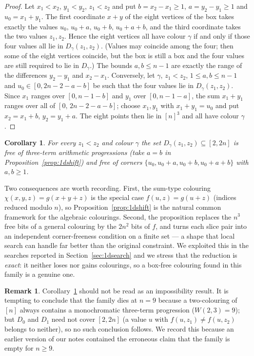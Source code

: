 \documentclass[11pt]{article}
\newtheorem{corollary}[theorem]{Corollary}
\theoremstyle{definition}
\newtheorem{remark}[theorem]{Remark}
\begin{document}
\begin{proof}
Let $x_1<x_2$, $y_1<y_2$, $z_1<z_2$ and put $b=x_2-x_1\ge1$, $a=y_2-y_1\ge1$ and
$u_0=x_1+y_1$. The first coordinate $x+y$ of the eight vertices of the box takes exactly
the values $u_0,\,u_0+a,\,u_0+b,\,u_0+a+b$, and the third coordinate takes the two values
$z_1,z_2$. Hence the eight vertices all have colour $\gamma$ if and only if those four
values all lie in $D_\gamma(z_1,z_2)$. (Values may coincide among the four; then some of
the eight vertices coincide, but the box is still a box and the four values are still
required to lie in $D_\gamma$.)
The bounds $a,b\le n-1$ are exactly the range of the differences $y_2-y_1$ and $x_2-x_1$.
Conversely, let $\gamma$, $z_1<z_2$, $1\le a,b\le n-1$ and $u_0\in[0,2n-2-a-b]$ be such
that the four values lie in $D_\gamma(z_1,z_2)$. Since $x_1$ ranges over $[0,n-1-b]$ and
$y_1$ over $[0,n-1-a]$, the sum $x_1+y_1$ ranges over all of $[0,\,2n-2-a-b]$; choose
$x_1,y_1$ with $x_1+y_1=u_0$ and put $x_2=x_1+b$, $y_2=y_1+a$. The eight points then lie in
$[n]^3$ and all have colour $\gamma$.
\end{proof}

\begin{corollary}\label{cor:ap}
For every $z_1<z_2$ and colour $\gamma$ the set $D_\gamma(z_1,z_2)\subseteq[2,2n]$ is free
of three-term arithmetic progressions (take $a=b$ in Proposition~\ref{prop:1dshift}) and
free of corners $\{u_0,u_0+a,u_0+b,u_0+a+b\}$ with $a,b\ge1$.
\end{corollary}

Two consequences are worth recording. First, the sum-type colouring
$\chi(x,y,z)=g(x+y+z)$ is the special case $f(u,z)=g(u+z)$ (indices reduced modulo $n$),
so Proposition~\ref{prop:1dshift} is the natural common framework for the algebraic
colourings. Second, the proposition replaces the $n^3$ free bits of a general colouring by
the $2n^2$ bits of $f$, and turns each slice pair into an independent corner-freeness
condition on a finite set --- a shape that local search can handle far better than the
original constraint. We exploited this in the searches reported in
Section~\ref{sec:1dsearch} and we stress that the reduction is \emph{exact}: it neither
loses nor gains colourings, so a box-free colouring found in this family is a genuine one.

\begin{remark}
Corollary~\ref{cor:ap} should not be read as an impossibility result. It is tempting to
conclude that the family dies at $n=9$ because a two-colouring of $[n]$ always contains a
monochromatic three-term progression ($W(2,3)=9$); but $D_0$ and $D_1$ need not cover
$[2,2n]$ (a value $u$ with $f(u,z_1)\neq f(u,z_2)$ belongs to neither), so no such
conclusion follows. We record this because an earlier version of our notes contained the
erroneous claim that the family is empty for $n\ge9$.
\end{remark}
\end{document}
